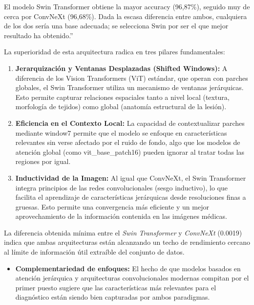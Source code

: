 El modelo Swin Transformer obtiene la mayor accuracy (96,87\%), seguido
muy de cerca por ConvNeXt (96,68\%). Dada la escasa diferencia entre
ambos, cualquiera de los dos sería una base adecuada; se selecciona Swin
por ser el que mejor resultado ha obtenido.''

La superioridad de esta arquitectura radica en tres pilares
fundamentales:

\begin{enumerate}
\def\labelenumi{\arabic{enumi}.}
\item
  \textbf{Jerarquización y Ventanas Desplazadas (Shifted Windows):} A
  diferencia de los Vision Transformers (ViT) estándar, que operan con
  parches globales, el Swin Transformer utiliza un mecanismo de ventanas
  jerárquicas. Esto permite capturar relaciones espaciales tanto a nivel
  local (textura, morfología de tejidos) como global (anatomía
  estructural de la lesión).
\item
  \textbf{Eficiencia en el Contexto Local:} La capacidad de
  contextualizar parches mediante window7 permite que el modelo se
  enfoque en características relevantes sin verse afectado por el ruido
  de fondo, algo que los modelos de atención global (como
  vit\_base\_patch16) pueden ignorar al tratar todas las regiones por
  igual.
\item
  \textbf{Inductividad de la Imagen:} Al igual que ConvNeXt, el Swin
  Transformer integra principios de las redes convolucionales (sesgo
  inductivo), lo que facilita el aprendizaje de características
  jerárquicas desde resoluciones finas a gruesas. Esto permite una
  convergencia más eficiente y un mejor aprovechamiento de la
  información contenida en las imágenes médicas.
\end{enumerate}

La diferencia obtenida mínima entre el \emph{Swin Transformer} y
\emph{ConvNeXt} (0.0019) indica que ambas arquitecturas están alcanzando
un techo de rendimiento cercano al límite de información útil extraíble
del conjunto de datos.

\begin{itemize}
\item
  \textbf{Complementariedad de enfoques:} El hecho de que modelos
  basados en atención jerárquica y arquitecturas convolucionales
  modernas compitan por el primer puesto sugiere que las características
  más relevantes para el diagnóstico están siendo bien capturadas por
  ambos paradigmas.
\end{itemize}


